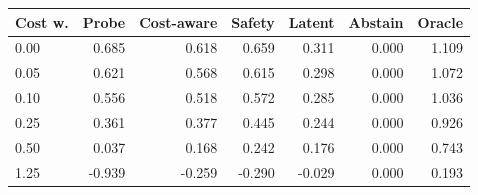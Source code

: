 \begin{tabular}{lrrrrrr}
\toprule
Cost w. & Probe & Cost-aware & Safety & Latent & Abstain & Oracle \\
\midrule
0.00 & 0.685 & 0.618 & 0.659 & 0.311 & 0.000 & 1.109 \\
0.05 & 0.621 & 0.568 & 0.615 & 0.298 & 0.000 & 1.072 \\
0.10 & 0.556 & 0.518 & 0.572 & 0.285 & 0.000 & 1.036 \\
0.25 & 0.361 & 0.377 & 0.445 & 0.244 & 0.000 & 0.926 \\
0.50 & 0.037 & 0.168 & 0.242 & 0.176 & 0.000 & 0.743 \\
1.25 & -0.939 & -0.259 & -0.290 & -0.029 & 0.000 & 0.193 \\
\bottomrule
\end{tabular}
